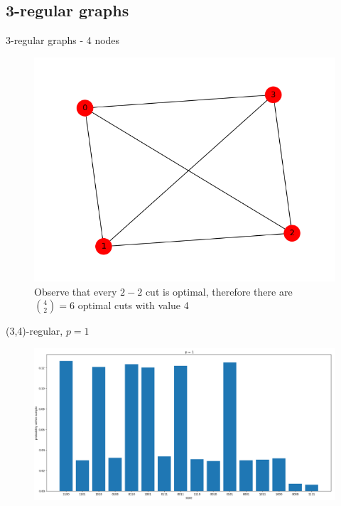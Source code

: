 \documentclass{beamer}
\begin{document}
\subsection{3-regular graphs}
\begin{frame}{3-regular graphs - 4 nodes}
\begin{figure}
	\includegraphics[scale=0.6]{figures/regular(3,4)-graph.png}
	\caption*{Observe that every $2-2$ cut is optimal, therefore there are ${4 \choose 2} = 6$ optimal cuts with value 4}
\end{figure}
\end{frame}

\begin{frame}{(3,4)-regular, $p = 1$}
\begin{figure}
\centering
\includegraphics[scale=0.3,left]{figures/regular(3,4)-p1.png}
\end{figure}
\end{frame}
\end{document}
